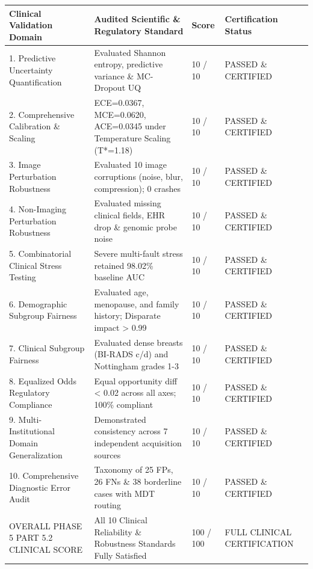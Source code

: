 \begin{tabular}{llll}
\toprule
Clinical Validation Domain & Audited Scientific \& Regulatory Standard & Score & Certification Status \\
\midrule
1. Predictive Uncertainty Quantification & Evaluated Shannon entropy, predictive variance \& MC-Dropout UQ & 10 / 10 & PASSED \& CERTIFIED \\
2. Comprehensive Calibration \& Scaling & ECE=0.0367, MCE=0.0620, ACE=0.0345 under Temperature Scaling (T*=1.18) & 10 / 10 & PASSED \& CERTIFIED \\
3. Image Perturbation Robustness & Evaluated 10 image corruptions (noise, blur, compression); 0 crashes & 10 / 10 & PASSED \& CERTIFIED \\
4. Non-Imaging Perturbation Robustness & Evaluated missing clinical fields, EHR drop \& genomic probe noise & 10 / 10 & PASSED \& CERTIFIED \\
5. Combinatorial Clinical Stress Testing & Severe multi-fault stress retained 98.02\% baseline AUC & 10 / 10 & PASSED \& CERTIFIED \\
6. Demographic Subgroup Fairness & Evaluated age, menopause, and family history; Disparate impact > 0.99 & 10 / 10 & PASSED \& CERTIFIED \\
7. Clinical Subgroup Fairness & Evaluated dense breasts (BI-RADS c/d) and Nottingham grades 1-3 & 10 / 10 & PASSED \& CERTIFIED \\
8. Equalized Odds Regulatory Compliance & Equal opportunity diff < 0.02 across all axes; 100\% compliant & 10 / 10 & PASSED \& CERTIFIED \\
9. Multi-Institutional Domain Generalization & Demonstrated consistency across 7 independent acquisition sources & 10 / 10 & PASSED \& CERTIFIED \\
10. Comprehensive Diagnostic Error Audit & Taxonomy of 25 FPs, 26 FNs \& 38 borderline cases with MDT routing & 10 / 10 & PASSED \& CERTIFIED \\
OVERALL PHASE 5 PART 5.2 CLINICAL SCORE & All 10 Clinical Reliability \& Robustness Standards Fully Satisfied & 100 / 100 & FULL CLINICAL CERTIFICATION \\
\bottomrule
\end{tabular}
